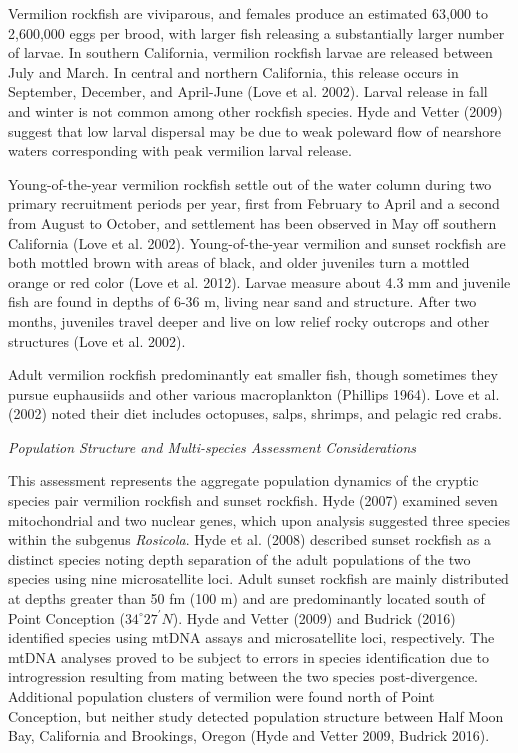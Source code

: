 \documentclass[
  english,
  a4paper,
]{article}
\begin{document}
Vermilion rockfish are viviparous, and females produce an estimated 63,000 to 2,600,000 eggs per brood, with larger fish releasing a substantially larger number of larvae.
In southern California, vermilion rockfish larvae are released between July and March.
In central and northern California, this release occurs in September, December, and
April-June (Love et al. 2002). Larval release in fall and winter is not common among other
rockfish species. Hyde and Vetter (2009) suggest that low larval dispersal may
be due to weak poleward flow of nearshore waters corresponding with peak vermilion larval release.

Young-of-the-year vermilion rockfish settle out of the water column during two primary recruitment
periods per year, first from February to April and a second from August to October,
and settlement has been observed in May off southern California (Love et al. 2002). Young-of-the-year vermilion and sunset rockfish are both mottled brown with areas of black, and older juveniles turn a mottled orange or red color (Love et al. 2012). Larvae
measure about 4.3 mm and juvenile fish are found in depths of 6-36 m, living near sand and structure. After two months, juveniles travel deeper and live on low relief rocky outcrops and
other structures (Love et al. 2002).

Adult vermilion rockfish predominantly eat smaller fish, though sometimes they pursue
euphausiids and other various macroplankton (Phillips 1964). Love et al. (2002) noted
their diet includes octopuses, salps, shrimps, and pelagic red crabs.

\emph{Population Structure and Multi-species Assessment Considerations}

This assessment represents the aggregate population dynamics of the cryptic species pair vermilion rockfish
and sunset rockfish.
Hyde (2007) examined seven mitochondrial and two nuclear genes, which upon analysis suggested
three species within the subgenus \emph{Rosicola}. Hyde et al. (2008) described sunset rockfish as a distinct species noting depth separation
of the adult populations of the two species using nine microsatellite loci.
Adult sunset rockfish are mainly distributed at depths
greater than 50 fm (100 m) and are predominantly located south of Point Conception ($34^\circ 27^\prime N$).
Hyde and Vetter (2009) and Budrick (2016) identified species using mtDNA assays and microsatellite loci,
respectively. The mtDNA analyses proved to be subject to errors in species identification due to introgression resulting from mating between the two species post-divergence.
Additional population clusters of vermilion were found north of Point Conception, but neither
study detected population structure between Half Moon Bay, California and Brookings,
Oregon (Hyde and Vetter 2009, Budrick 2016).
\end{document}

